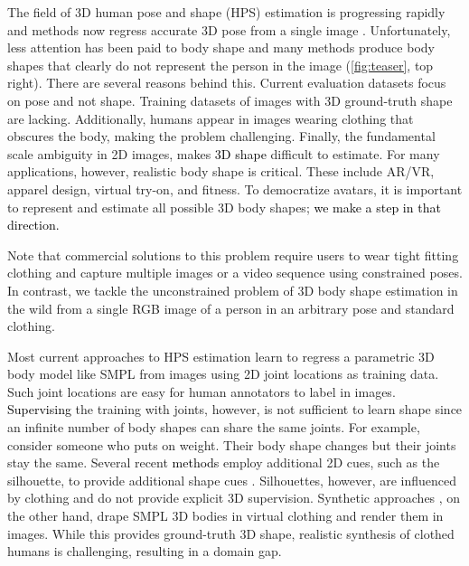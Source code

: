 \documentclass[10pt,twocolumn,letterpaper]{article}
\newcommand{\TODO}[1]{\xspace{\color{red} #1}\xspace}
\renewcommand{\TODO}[1]{\xspace{\color{black} #1}\xspace}
\newcommand{\twoD}{2D\xspace}
\newcommand{\threeD}{3D\xspace}
\newcommand{\hps}{\mbox{HPS}\xspace}
\newcommand{\HPS}{\hps}
\newcommand{\smpl}{\mbox{SMPL}\xspace}
\newcommand{\cameraready}[1]{\textcolor{Fuchsia}{{#1}}\xspace}
\renewcommand{\cameraready}[1]{\textcolor{black}{{#1}}\xspace}
\begin{document}
The field of \threeD human pose and shape (\HPS) estimation is progressing rapidly and methods now regress accurate \threeD pose from a single image \cite{bogo2016keep,Joo2018_adam,kanazawa_2019_cvpr,VIBE:CVPR:2020,Kolotouros2019_spin,Pavlakos2019_smplifyx,xu2020ghum,pare,spec,pymaf}.
Unfortunately, less attention has been paid to body shape and many methods produce body shapes that clearly do not represent the person in the image (\cref{fig:teaser}, top right).
There are several reasons behind this.
Current evaluation datasets focus on pose and not shape. Training datasets of images with \threeD ground-truth shape are lacking.
Additionally, humans appear in images wearing clothing that obscures the body, making the problem challenging.
Finally, the fundamental scale ambiguity in \twoD images, makes 
\cameraready{\threeD shape} 
difficult to estimate.
For many applications, however, realistic body shape is critical.
These include AR/VR, apparel design, virtual try-on, and fitness.
To democratize avatars, it is important to represent and estimate all possible \threeD body shapes; \cameraready{we make a step in that direction.}



Note that commercial solutions to this problem require users to wear tight fitting clothing and capture multiple images or a video sequence using constrained poses.
In contrast, we tackle the unconstrained problem of \threeD body shape estimation in the wild from a single RGB image of a person in an arbitrary pose and standard clothing.

Most current approaches to \HPS estimation learn to regress a parametric \threeD body model like \smpl \cite{SMPL:2015} from images using \twoD joint locations as training data. 
Such joint locations are easy for human annotators to label in images.
\cameraready{Supervising} the training with joints, however, is not sufficient to learn shape since an infinite number of body shapes can share the same joints.
For example, consider someone who puts on weight.  Their body shape changes but their joints stay the same.
Several recent \cameraready{methods} employ additional \twoD cues, such as the silhouette, to provide additional shape cues \cite{sengupta2020straps, sengupta2021hierarchicalICCV}.
Silhouettes, however, are influenced by clothing and do not \TODO{provide} explicit \threeD supervision.
Synthetic approaches \cite{Liang_2019_ICCV}, on the other hand, drape SMPL \threeD bodies in virtual clothing and render them in images.
While this provides ground-truth \threeD shape, realistic synthesis of clothed humans is challenging, resulting in a domain gap.
 
\end{document}
